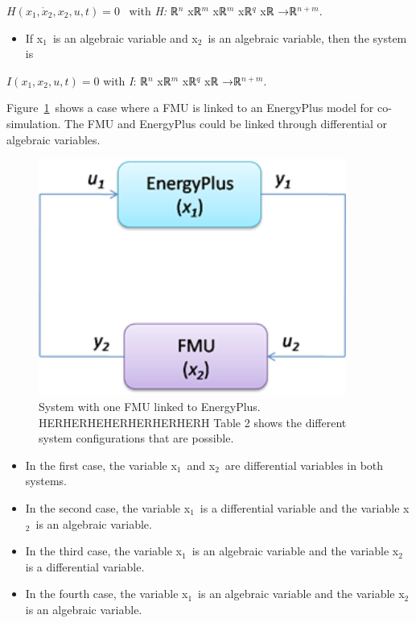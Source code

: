 \(H\left(x_1,\dot x_2,x_2,u,t\right) = 0\) ~with \emph{H:} ℝ\(^{n}\) xℝ\(^{m}\) xℝ\(^{m}\) xℝ\(^{q}\) xℝ →ℝ\(^{n+m}\).

\begin{itemize}
\tightlist
\item
  If x\(_{1}\)~is an algebraic variable and x\(_{2}\)~is an algebraic variable, then the system is
\end{itemize}

\(I\left(x_1,x_2,u,t\right) = 0\) with \emph{I}: ℝ\(^{n}\) xℝ\(^{m}\) xℝ\(^{q}\) xℝ →ℝ\(^{n+m}\).

Figure~\ref{fig:system-with-one-fmu-linked-to-energyplus.}~shows a case where a FMU is linked to an EnergyPlus model for co-simulation. The FMU and EnergyPlus could be linked through differential or algebraic variables.

\begin{figure}[hbtp] %
\centering
\includegraphics[width=0.9\textwidth, height=0.9\textheight, keepaspectratio=true]{media/image016.png}
\caption{System with one FMU linked to EnergyPlus. HERHERHEHERHERHERHERH Table 2 shows the different system configurations that are possible. \protect \label{fig:system-with-one-fmu-linked-to-energyplus.}}
\end{figure}

\begin{itemize}
\item
  In the first case, the variable x\(_{1}\)~and x\(_{2}\)~are differential variables in both systems.
\item
  In the second case, the variable x\(_{1}\)~is a differential variable and the variable x\(_{2}\)~is an algebraic variable.
\item
  In the third case, the variable x\(_{1}\)~is an algebraic variable and the variable x\(_{2}\) is a differential variable.
\item
  In the fourth case, the variable x\(_{1}\)~is an algebraic variable and the variable x\(_{2}\) is an algebraic variable.
\end{itemize}

